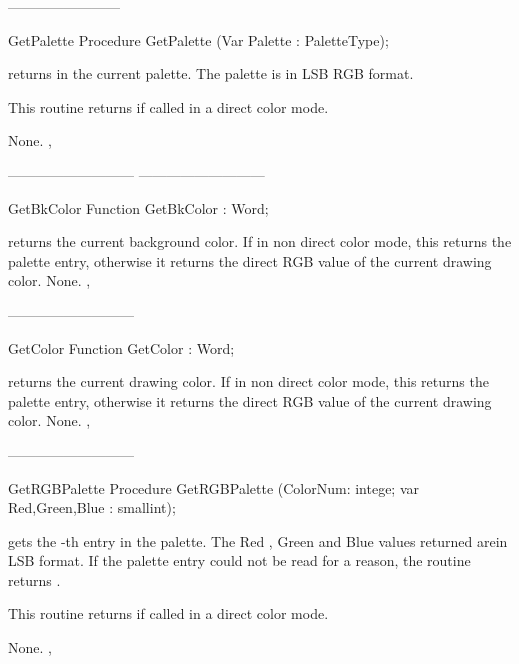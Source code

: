 ------------------------
\begin{procedure}{GetPalette}
\Declaration
Procedure GetPalette (Var Palette : PaletteType);

\Description
{} returns in  the current palette. The palette
is in LSB RGB format.

This routine returns  if called in a direct color mode.

\Errors
None.
\SeeAlso
{}, 
\end{procedure}
---------------------------
---------------------------
\begin{function}{GetBkColor}
\Declaration
Function GetBkColor  : Word;

\Description
{} returns the current background color. If in non direct color
mode, this returns the palette entry, otherwise it returns the direct
RGB value of the current drawing color.
\Errors
None.
\SeeAlso
{},
\end{function}
---------------------------
\begin{function}{GetColor}
\Declaration
Function GetColor  : Word;

\Description
{} returns the current drawing color. If in non direct color
mode, this returns the palette entry, otherwise it returns the direct
RGB value of the current drawing color.
\Errors
None.
\SeeAlso
{},
\end{function}
---------------------------
\begin{procedure}{GetRGBPalette}
\Declaration
Procedure GetRGBPalette (ColorNum: intege; var Red,Green,Blue : smallint);

\Description
{} gets the -th entry in the palette.
The Red , Green and Blue values returned arein LSB format.
If the palette entry could not be read for a reason,
the routine returns .

This routine returns  if called in a direct color mode.

\Errors
None.
\SeeAlso
{},
\end{procedure}

